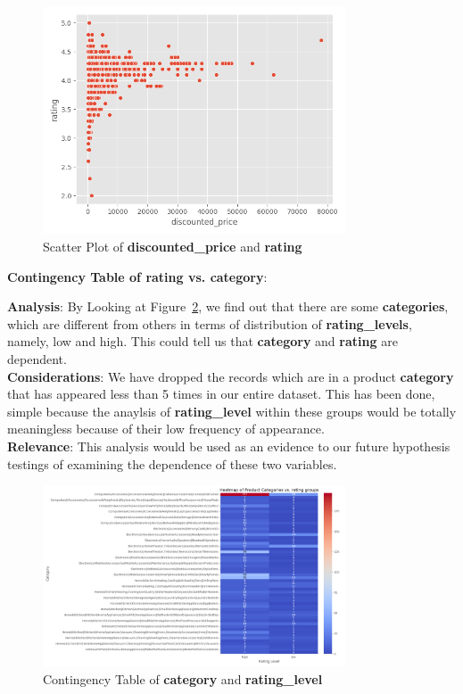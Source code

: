 \documentclass[a4paper,12pt]{article}
\begin{document}
\begin{figure}[H]
    \centering
    \includegraphics[width=0.8\textwidth]{./images/scatter_discounted_price_vs_rating.png} %
    \caption{Scatter Plot of \textbf{discounted\_price} and \textbf{rating}}
    \label{fig:Figure_4}
\end{figure}

\noindent\textbf{Contingency Table of rating vs. category}:

\noindent\textbf{Analysis}: By Looking at Figure~\ref{fig:Figure_5}, we find out that there are some \textbf{categories}, which are different from others in terms of distribution of \textbf{rating\_levels}, namely, low and high. This could tell us that \textbf{category} and \textbf{rating} are dependent. \\ 

\noindent\textbf{Considerations}: We have dropped the records which are in a product \textbf{category} that has appeared less than 5 times in our entire dataset. This has been done, simple because the anaylsis of \textbf{rating\_level} within these groups would be totally meaningless because of their low frequency of appearance. \\ 

\noindent\textbf{Relevance}: This analysis would be used as an evidence to our future hypothesis testings of examining the dependence of these two variables.\\

\begin{figure}[H]
    \centering
    \includegraphics[width=0.8\textwidth]{./images/contingency_category_rating.png} %
    \caption{Contingency Table of \textbf{category} and \textbf{rating\_level}}
    \label{fig:Figure_5}
\end{figure}
\end{document}
